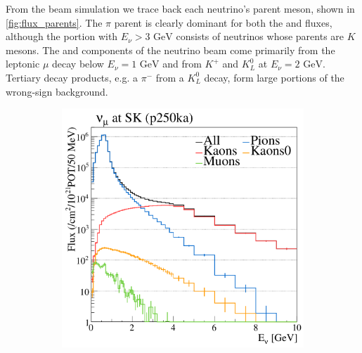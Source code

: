 From the beam simulation we trace back each neutrino's parent meson, shown in \autoref{fig:flux_parents}. The $\pi$ parent is clearly dominant for both the \numu and \numubar fluxes, although the portion with $E_\nu > 3\text{ GeV}$ consists of neutrinos whose parents are $K$ mesons. The \nue and \nuebar components of the neutrino beam come primarily from the leptonic $\mu$ decay below $E_\nu = 1 \text{ GeV}$ and from $K^+$ and $K^0_L$ at $E_\nu = 2 \text{ GeV}$. Tertiary decay products, e.g. a $\pi^-$ from a $K^0_L$ decay, form large portions of the wrong-sign background.
\begin{figure}[h]
	\begin{subfigure}[t]{0.32\textwidth}
		\includegraphics[width=\textwidth, trim={0mm 0mm 0mm 0mm}, clip,page=1]{figures/det_chap/beam/numu_sk_parents}
	\end{subfigure}
	\begin{subfigure}[t]{0.32\textwidth}

\end{subfigure}
\end{figure}
